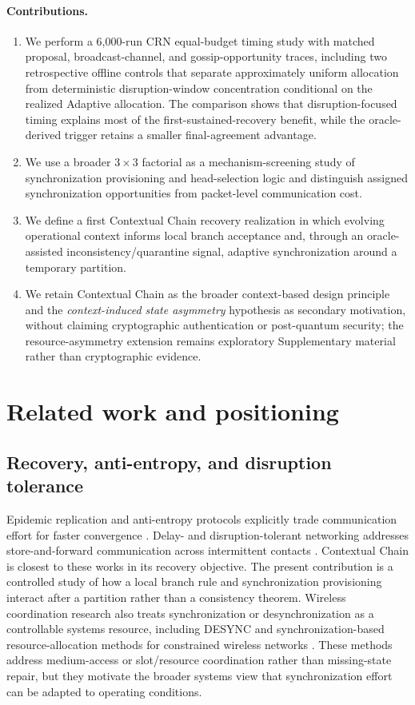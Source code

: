 \documentclass[11pt]{article}
\begin{document}
\paragraph{Contributions.}
\begin{enumerate}
\item We perform a 6,000-run CRN equal-budget timing study with matched proposal, broadcast-channel, and gossip-opportunity traces, including two retrospective offline controls that separate approximately uniform allocation from deterministic disruption-window concentration conditional on the realized Adaptive allocation. The comparison shows that disruption-focused timing explains most of the first-sustained-recovery benefit, while the oracle-derived trigger retains a smaller final-agreement advantage.
\item We use a broader $3\times3$ factorial as a mechanism-screening study of synchronization provisioning and head-selection logic and distinguish assigned synchronization opportunities from packet-level communication cost.
\item We define a first Contextual Chain recovery realization in which evolving operational context informs local branch acceptance and, through an oracle-assisted inconsistency/quarantine signal, adaptive synchronization around a temporary partition.
\item We retain Contextual Chain as the broader context-based design principle and the \emph{context-induced state asymmetry} hypothesis as secondary motivation, without claiming cryptographic authentication or post-quantum security; the resource-asymmetry extension remains exploratory Supplementary material rather than cryptographic evidence.
\end{enumerate}

\section{Related work and positioning}
\subsection{Recovery, anti-entropy, and disruption tolerance}
Epidemic replication and anti-entropy protocols explicitly trade communication effort for faster convergence \cite{Demers1987Epidemic}. Delay- and disruption-tolerant networking addresses store-and-forward communication across intermittent contacts \cite{Cerf2007DTN}. Contextual Chain is closest to these works in its recovery objective. The present contribution is a controlled study of how a local branch rule and synchronization provisioning interact after a partition rather than a consistency theorem.
Wireless coordination research also treats synchronization or desynchronization as a controllable systems resource, including DESYNC and synchronization-based resource-allocation methods for constrained wireless networks \cite{Degesys2007DESYNC,Yu2019KuramotoDesynch,YasudaDesynch,KimTOWSync2021}. These methods address medium-access or slot/resource coordination rather than missing-state repair, but they motivate the broader systems view that synchronization effort can be adapted to operating conditions.
\end{document}
